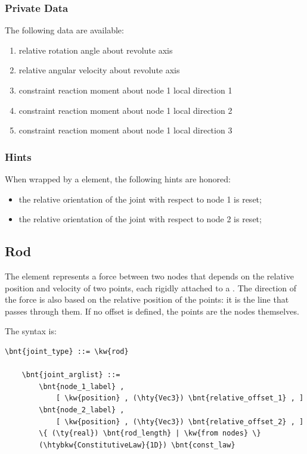 \subsubsection{Private Data}
The following data are available:
\begin{enumerate}
\item {} relative rotation angle about revolute axis
\item {} relative angular velocity about revolute axis
\item {} constraint reaction moment about node 1 local direction 1
\item {} constraint reaction moment about node 1 local direction 2
\item {} constraint reaction moment about node 1 local direction 3
\end{enumerate}

\subsubsection{Hints}
When wrapped by a  element, the following hints are honored:
\begin{itemize}
\item {} the relative orientation of the joint
with respect to node 1 is reset;
\item {} the relative orientation of the joint
with respect to node 2 is reset;
\end{itemize}





\subsection{Rod}\label{sec:EL:STRUCT:JOINT:ROD}
The  element represents a force between two nodes that depends
on the relative position and velocity of two points, each rigidly attached
to a .
The direction of the force is also based on the relative position
of the points: it is the line that passes through them.
If no offset is defined, the points are the nodes themselves.

The syntax is:
\begin{Verbatim}[commandchars=\\\{\}]
    \bnt{joint_type} ::= \kw{rod}

    \bnt{joint_arglist} ::=
        \bnt{node_1_label} ,
            [ \kw{position} , (\hty{Vec3}) \bnt{relative_offset_1} , ]
        \bnt{node_2_label} , 
            [ \kw{position} , (\hty{Vec3}) \bnt{relative_offset_2} , ]
        \{ (\ty{real}) \bnt{rod_length} | \kw{from nodes} \}
        (\htybkw{ConstitutiveLaw}{1D}) \bnt{const_law}
\end{Verbatim}

